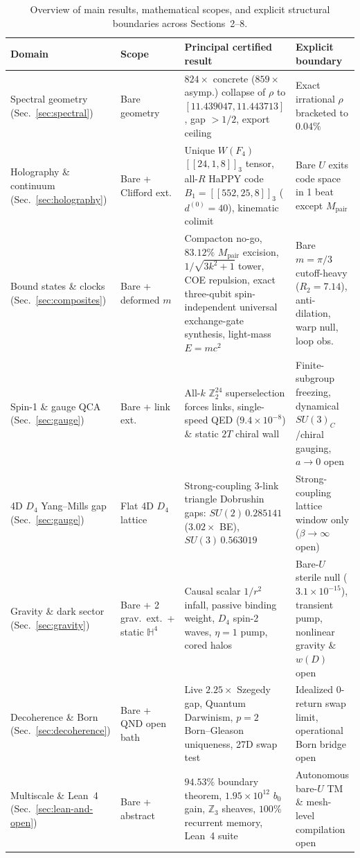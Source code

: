 \begin{table}[tb]
\centering
\caption{Overview of main results, mathematical scopes, and explicit structural boundaries across Sections~2--8.}
\label{tab:scope-summary}
\footnotesize
\begin{tabularx}{\textwidth}{@{}>{\raggedright\arraybackslash}p{3.00cm}>{\raggedright\arraybackslash}p{2.30cm}>{\raggedright\arraybackslash}X>{\raggedright\arraybackslash}p{3.55cm}@{}}
\toprule
Domain & Scope & Principal certified result & Explicit boundary \\
\midrule
Spectral geometry (Sec.~\ref{sec:spectral}) & Bare geometry & $824\times$ concrete ($859\times$ asymp.) collapse of $\rho$ to $[11.439047, 11.443713]$, gap $> 1/2$, export ceiling & Exact irrational $\rho$ bracketed to $0.04\%$ \\
\addlinespace[2pt]
Holography \& continuum (Sec.~\ref{sec:holography}) & Bare + Clifford ext. & Unique $W(F_4)$ $[[24,1,8]]_3$ tensor, all-$R$ HaPPY code $B_1 = [[552,25,8]]_3$ ($d^{(0)} = 40$), kinematic colimit & Bare $U$ exits code space in 1 beat except $M_{\mathrm{pair}}$ \\
\addlinespace[2pt]
Bound states \& clocks (Sec.~\ref{sec:composites}) & Bare + deformed $m$ & Compacton no-go, $83.12\%$ $M_{\mathrm{pair}}$ excision, $1/\sqrt{3k^2+1}$ tower, COE repulsion, exact three-qubit spin-independent universal exchange-gate synthesis, light-mass $E = mc^2$ & Bare $m = \pi/3$ cutoff-heavy ($R_2 = 7.14$), anti-dilation, warp null, loop obs. \\
\addlinespace[2pt]
Spin-1 \& gauge QCA (Sec.~\ref{sec:gauge}) & Bare + link ext. & All-$k$ $\mathbb{Z}_2^{24}$ superselection forces links, single-speed QED ($9.4 \times 10^{-8}$) \& static $2T$ chiral wall & Finite-subgroup freezing, dynamical $SU(3)_C$/chiral gauging, $a \to 0$ open \\
\addlinespace[2pt]
4D $D_4$ Yang--Mills gap (Sec.~\ref{sec:gauge}) & Flat 4D $D_4$ lattice & Strong-coupling 3-link triangle Dobrushin gaps: $SU(2)\, 0.285141$ ($3.02\times$ BE), $SU(3)\, 0.563019$ & Strong-coupling lattice window only ($\beta \to \infty$ open) \\
\addlinespace[2pt]
Gravity \& dark sector (Sec.~\ref{sec:gravity}) & Bare + 2 grav.\ ext.\ + static $\mathbb{H}^4$ & Causal scalar $1/r^2$ infall, passive binding weight, $D_4$ spin-2 waves, $\eta = 1$ pump, cored halos & Bare-$U$ sterile null ($3.1 \times 10^{-15}$), transient pump, nonlinear gravity \& $w(D)$ open \\
\addlinespace[2pt]
Decoherence \& Born (Sec.~\ref{sec:decoherence}) & Bare + QND open bath & Live $2.25\times$ Szegedy gap, Quantum Darwinism, $p = 2$ Born--Gleason uniqueness, 27D swap test & Idealized 0-return swap limit, operational Born bridge open \\
\addlinespace[2pt]
Multiscale \& Lean~4 (Sec.~\ref{sec:lean-and-open}) & Bare + abstract & $94.53\%$ boundary theorem, $1.95 \times 10^{12}$ $b_0$ gain, $\mathbb{Z}_3$ sheaves, $100\%$ recurrent memory, Lean~4 suite & Autonomous bare-$U$ TM \& mesh-level compilation open \\
\bottomrule
\end{tabularx}
\end{table}

